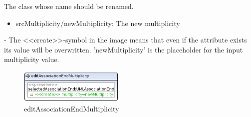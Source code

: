 {The class whose name should be renamed.}
{
\begin{itemize}
 \item srcMultiplicity/newMultiplicity: The new multiplicity
\end{itemize}
}
{-}
{The \textless\textless create\textgreater\textgreater  -symbol in the image
means that even if the attribute exists its value will be overwritten.
'newMultiplicity' is the placeholder for the input multiplicity value.}
\begin{figure}[H]
  \centering
  \includegraphics[width=0.45\textwidth]{pics/editAssociationEndMultiplicity.png}
  \caption{editAssociationEndMultiplicity}
  \label{editAssociationEndMultiplicity}
\end{figure}